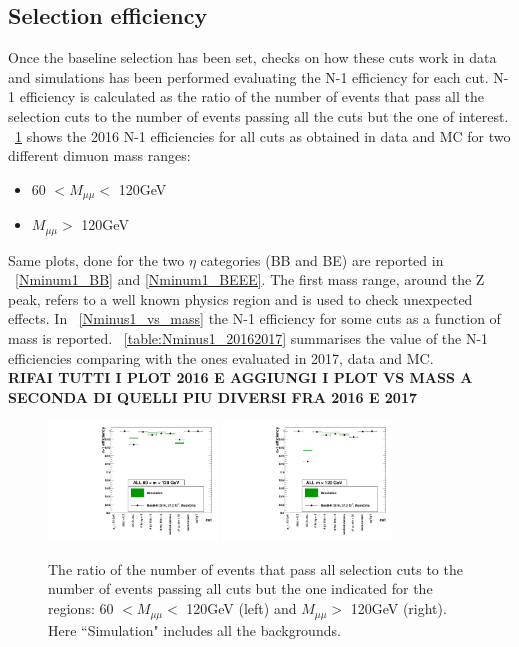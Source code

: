 \subsection{Selection efficiency}
Once the baseline selection has been set, checks on how these cuts work in data and simulations has been performed evaluating the N-1 efficiency for each cut. N-1 efficiency is calculated as the ratio of the number of events that pass all the selection cuts to the number of events passing all the cuts but the one of interest. \figurename~\ref{Nminum1} shows the 2016 N-1 efficiencies for all cuts as obtained in data and MC for two different dimuon mass ranges:
\begin{itemize}
\item 60 $< M_{\mu\mu} <$ 120GeV
\item  $M_{\mu\mu} >$ 120GeV
\end{itemize}
Same plots, done for the two $\eta$ categories (BB and BE) are reported in \figurename~\ref{Nminum1_BB} and \ref{Nminum1_BEEE}. 
The first mass range, around the Z peak, refers to a well known physics region and is used to check unexpected effects. In \figurename~\ref{Nminus1_vs_mass} the N-1 efficiency for some cuts as a function of mass is reported. \tablename~\ref{table:Nminus1_20162017} summarises the value of the N-1 efficiencies comparing with the ones evaluated in 2017, data and MC. \\
\textbf{RIFAI TUTTI I PLOT 2016 E AGGIUNGI I PLOT VS MASS A SECONDA DI QUELLI PIU DIVERSI FRA 2016 E 2017}
\begin{figure}[htbp]
\centering
\includegraphics[width=0.4\textwidth]{Images/Cap5/60m120ALL.pdf}
\includegraphics[width=0.4\textwidth]{Images/Cap5/120mALL.pdf}
\caption{The ratio of the number of events that pass all selection cuts to the number of events passing all cuts but the one indicated for the regions: 60 $< M_{\mu\mu} <$ 120GeV (left) and $M_{\mu\mu} >$ 120GeV (right). Here ``Simulation" includes all the backgrounds.}
\label{Nminum1}
\end{figure}

